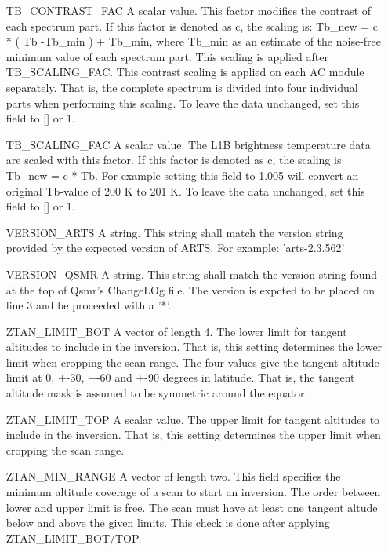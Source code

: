 \begin{changemargin}{2.5cm}{0.0cm}
\begin{itemize}
\item[{TB\_CONTRAST\_FAC}] 
A scalar value. This factor modifies the contrast of each spectrum part.
If this factor is denoted as c, the scaling is:
Tb\_new = c * ( Tb -Tb\_min ) + Tb\_min,
where Tb\_min as an estimate of the noise-free minimum value of each
spectrum part. This scaling is applied after TB\_SCALING\_FAC. This contrast
scaling is applied on each AC module separately. That is, the complete
spectrum is divided into four individual parts when performing this scaling.
To leave the data unchanged, set this field to {[}{]} or 1.

\item[{TB\_SCALING\_FAC}] 
A scalar value. The L1B brightness temperature data are scaled with this
factor. If this factor is denoted as c, the scaling is Tb\_new = c * Tb.
For example setting this field to 1.005 will convert an original  Tb-value
of 200 K to 201 K. To leave the data unchanged, set this field to {[}{]} or 1.

\item[{VERSION\_ARTS}] 
A string. This string shall match the version string provided by the
expected version of ARTS. For example: 'arts-2.3.562'

\item[{VERSION\_QSMR}] 
A string. This string shall match the version string found at the top of
Qsmr's ChangeLOg file. The version is expcted to be placed on line 3 and be
proceeded with a '*'.

\item[{ZTAN\_LIMIT\_BOT}] 
A vector of length 4. The lower limit for tangent altitudes to include in
the inversion. That is, this setting determines the lower limit when
cropping the scan range. The four values give the tangent altitude limit at
0, +-30, +-60 and +-90 degrees in latitude. That is, the tangent altitude
mask is assumed to be symmetric around the equator.

\item[{ZTAN\_LIMIT\_TOP}] 
A scalar value. The upper limit for tangent altitudes to include in the
inversion. That is, this setting determines the upper limit when cropping
the scan range.

\item[{ZTAN\_MIN\_RANGE}] 
A vector of length two. This field specifies the minimum altitude coverage of a
scan to start an inversion. The order between lower and upper limit is free.
The scan must have at least one tangent altude below and above the given
limits. This check is done after applying ZTAN\_LIMIT\_BOT/TOP.

\end{itemize}

\end{changemargin}

